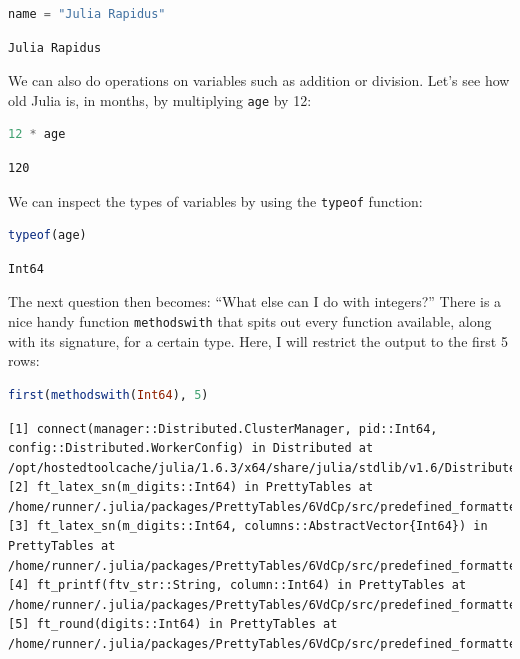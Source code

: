 \documentclass[
  notoc %
]{tufte-book}
\newcommand{\passthrough}[1]{#1}
\begin{document}
\begin{lstlisting}[language=Julia]
name = "Julia Rapidus"
\end{lstlisting}

\begin{lstlisting}[language=Output]
Julia Rapidus
\end{lstlisting}

We can also do operations on variables such as addition or division.
Let's see how old Julia is, in months, by multiplying
\passthrough{\lstinline!age!} by 12:

\begin{lstlisting}[language=Julia]
12 * age
\end{lstlisting}

\begin{lstlisting}[language=Output]
120
\end{lstlisting}

We can inspect the types of variables by using the
\passthrough{\lstinline!typeof!} function:

\begin{lstlisting}[language=Julia]
typeof(age)
\end{lstlisting}

\begin{lstlisting}[language=Output]
Int64
\end{lstlisting}

The next question then becomes: ``What else can I do with integers?''
There is a nice handy function \passthrough{\lstinline!methodswith!}
that spits out every function available, along with its signature, for a
certain type. Here, I will restrict the output to the first 5 rows:

\begin{lstlisting}[language=Julia]
first(methodswith(Int64), 5)
\end{lstlisting}

\begin{lstlisting}[language=Output]
[1] connect(manager::Distributed.ClusterManager, pid::Int64, config::Distributed.WorkerConfig) in Distributed at /opt/hostedtoolcache/julia/1.6.3/x64/share/julia/stdlib/v1.6/Distributed/src/managers.jl:516
[2] ft_latex_sn(m_digits::Int64) in PrettyTables at /home/runner/.julia/packages/PrettyTables/6VdCp/src/predefined_formatters.jl:137
[3] ft_latex_sn(m_digits::Int64, columns::AbstractVector{Int64}) in PrettyTables at /home/runner/.julia/packages/PrettyTables/6VdCp/src/predefined_formatters.jl:139
[4] ft_printf(ftv_str::String, column::Int64) in PrettyTables at /home/runner/.julia/packages/PrettyTables/6VdCp/src/predefined_formatters.jl:28
[5] ft_round(digits::Int64) in PrettyTables at /home/runner/.julia/packages/PrettyTables/6VdCp/src/predefined_formatters.jl:78
\end{lstlisting}
\end{document}
